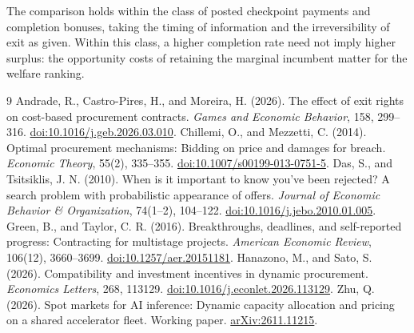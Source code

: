 \documentclass[11pt]{article}
\begin{document}
The comparison holds within the class of posted checkpoint payments and completion bonuses, taking the timing of information and the irreversibility of exit as given. Within this class, a higher completion rate need not imply higher surplus: the opportunity costs of retaining the marginal incumbent matter for the welfare ranking.

\begin{thebibliography}{9}
Andrade, R., Castro-Pires, H., and Moreira, H. (2026).
The effect of exit rights on cost-based procurement contracts.
\textit{Games and Economic Behavior}, 158, 299--316.
\href{https://doi.org/10.1016/j.geb.2026.03.010}{doi:10.1016/j.geb.2026.03.010}.
Chillemi, O., and Mezzetti, C. (2014).
Optimal procurement mechanisms: Bidding on price and damages for breach.
\textit{Economic Theory}, 55(2), 335--355.
\href{https://doi.org/10.1007/s00199-013-0751-5}{doi:10.1007/s00199-013-0751-5}.
Das, S., and Tsitsiklis, J. N. (2010).
When is it important to know you've been rejected? A search problem with probabilistic appearance of offers.
\textit{Journal of Economic Behavior \& Organization}, 74(1--2), 104--122.
\href{https://doi.org/10.1016/j.jebo.2010.01.005}{doi:10.1016/j.jebo.2010.01.005}.
Green, B., and Taylor, C. R. (2016).
Breakthroughs, deadlines, and self-reported progress: Contracting for multistage projects.
\textit{American Economic Review}, 106(12), 3660--3699.
\href{https://doi.org/10.1257/aer.20151181}{doi:10.1257/aer.20151181}.
Hanazono, M., and Sato, S. (2026).
Compatibility and investment incentives in dynamic procurement.
\textit{Economics Letters}, 268, 113129.
\href{https://doi.org/10.1016/j.econlet.2026.113129}{doi:10.1016/j.econlet.2026.113129}.
Zhu, Q. (2026).
Spot markets for AI inference: Dynamic capacity allocation and pricing on a shared accelerator fleet.
Working paper. \href{https://arxiv.org/abs/2611.11215}{arXiv:2611.11215}.
\end{thebibliography}
\end{document}
